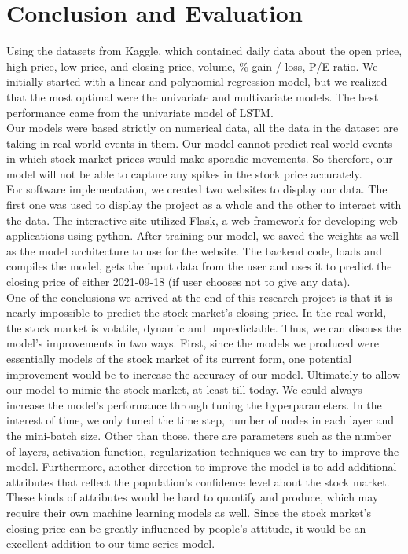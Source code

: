 \documentclass{article}
\begin{document}
\section{Conclusion and Evaluation} 
Using the datasets from Kaggle, which contained daily data about the open price, high price, low price, and closing price, volume, \% gain / loss, P/E ratio. We initially started with a linear and polynomial regression model, but we realized that the most optimal were the univariate and multivariate models. The best performance came from the univariate model of LSTM.\\
Our models were based strictly on numerical data, all the data in the dataset are taking in real world events in them. Our model cannot predict real world events in which stock market prices would make sporadic movements. So therefore, our model will not be able to capture any spikes in the stock price accurately.\\
For software implementation, we created two websites to display our data. The first one was used to display the project as a whole and the other to interact with the data. The interactive site utilized Flask, a web framework for developing web applications using python. After training our model, we saved the weights as well as the model architecture to use for the website. The backend code, loads and compiles the model, gets the input data from the user and uses it to predict the closing price of either 2021-09-18 (if user chooses not to give any data).\\
One of the conclusions we arrived at the end of this research project is that it is nearly impossible to predict the stock market’s closing price. In the real world, the stock market is volatile, dynamic and unpredictable. Thus, we can discuss the model’s improvements in two ways. First, since the models we produced were essentially models of the stock market of its current form, one potential improvement would be to increase the accuracy of our model. Ultimately to allow our model to mimic the stock market, at least till today. We could always increase the model’s performance through tuning the hyperparameters. In the interest of time, we only tuned the time step, number of nodes in each layer and the mini-batch size. Other than those, there are parameters such as the number of layers, activation function, regularization techniques we can try to improve the model. Furthermore, another direction to improve the model is to add additional attributes that reflect the population’s confidence level about the stock market. These kinds of attributes would be hard to quantify and produce, which may require their own machine learning models as well. Since the stock market’s closing price can be greatly influenced by people’s attitude, it would be an excellent addition to our time series model. 	
\end{document}

